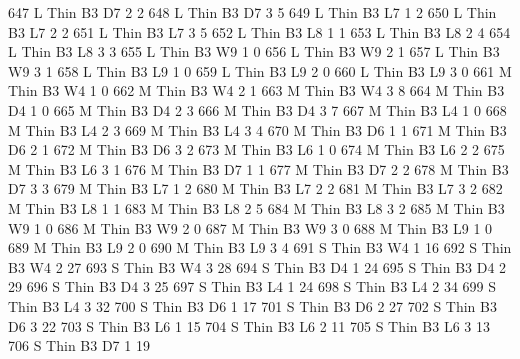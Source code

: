 \documentclass{article}
\begin{document}
\begin{Schunk}
\begin{Soutput}
647       L   Thin   B3      D7     2     2
648       L   Thin   B3      D7     3     5
649       L   Thin   B3      L7     1     2
650       L   Thin   B3      L7     2     2
651       L   Thin   B3      L7     3     5
652       L   Thin   B3      L8     1     1
653       L   Thin   B3      L8     2     4
654       L   Thin   B3      L8     3     3
655       L   Thin   B3      W9     1     0
656       L   Thin   B3      W9     2     1
657       L   Thin   B3      W9     3     1
658       L   Thin   B3      L9     1     0
659       L   Thin   B3      L9     2     0
660       L   Thin   B3      L9     3     0
661       M   Thin   B3      W4     1     0
662       M   Thin   B3      W4     2     1
663       M   Thin   B3      W4     3     8
664       M   Thin   B3      D4     1     0
665       M   Thin   B3      D4     2     3
666       M   Thin   B3      D4     3     7
667       M   Thin   B3      L4     1     0
668       M   Thin   B3      L4     2     3
669       M   Thin   B3      L4     3     4
670       M   Thin   B3      D6     1     1
671       M   Thin   B3      D6     2     1
672       M   Thin   B3      D6     3     2
673       M   Thin   B3      L6     1     0
674       M   Thin   B3      L6     2     2
675       M   Thin   B3      L6     3     1
676       M   Thin   B3      D7     1     1
677       M   Thin   B3      D7     2     2
678       M   Thin   B3      D7     3     3
679       M   Thin   B3      L7     1     2
680       M   Thin   B3      L7     2     2
681       M   Thin   B3      L7     3     2
682       M   Thin   B3      L8     1     1
683       M   Thin   B3      L8     2     5
684       M   Thin   B3      L8     3     2
685       M   Thin   B3      W9     1     0
686       M   Thin   B3      W9     2     0
687       M   Thin   B3      W9     3     0
688       M   Thin   B3      L9     1     0
689       M   Thin   B3      L9     2     0
690       M   Thin   B3      L9     3     4
691       S   Thin   B3      W4     1    16
692       S   Thin   B3      W4     2    27
693       S   Thin   B3      W4     3    28
694       S   Thin   B3      D4     1    24
695       S   Thin   B3      D4     2    29
696       S   Thin   B3      D4     3    25
697       S   Thin   B3      L4     1    24
698       S   Thin   B3      L4     2    34
699       S   Thin   B3      L4     3    32
700       S   Thin   B3      D6     1    17
701       S   Thin   B3      D6     2    27
702       S   Thin   B3      D6     3    22
703       S   Thin   B3      L6     1    15
704       S   Thin   B3      L6     2    11
705       S   Thin   B3      L6     3    13
706       S   Thin   B3      D7     1    19

\end{Soutput}
\end{Schunk}
\end{document}
